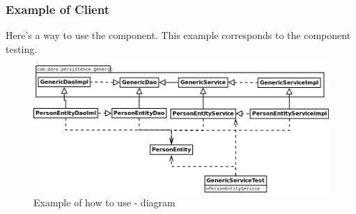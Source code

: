 \documentclass[a4paper,11pt]{book}
\begin{document}
\pagebreak
\subsubsection{Example of Client}
Here's a way to use the component. This example corresponds to the component testing.

\begin{figure}[h] %
  \includegraphics[width=\textwidth]{generic_persistence_class_diagram_to_use}
  \caption{Example of how to use - diagram}
  \centering
  \label{fig:generic_persistence_class_diagram_to_use} %
\end{figure}
\end{document}
